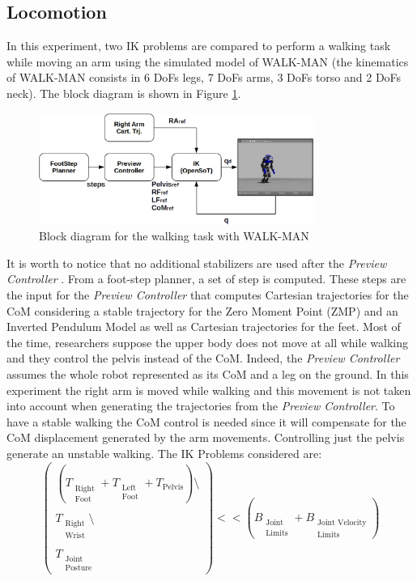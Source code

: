 \subsection{Locomotion}
In this experiment, two IK problems are compared to perform a walking task while moving an arm using the simulated model of WALK-MAN (the kinematics of WALK-MAN consists in 6 DoFs legs, 7 DoFs arms, 3 DoFs torso and 2 DoFs neck). The block diagram is shown in Figure \ref{walk_block_diagram}.
\begin{figure}[!h]
\vspace{2 mm}
\centering
\includegraphics[width=0.8\textwidth]{images/walking/walking.eps}
\caption{Block diagram for the walking task with WALK-MAN}
\label{walk_block_diagram}
\end{figure}
It is worth to notice that no additional stabilizers are used after the \emph{Preview Controller} \cite{Kajita:03}.
From a foot-step planner, a set of step is computed. These steps are the input for the \emph{Preview Controller} that computes Cartesian trajectories for the CoM considering a stable trajectory for the Zero Moment Point (ZMP) and an Inverted Pendulum Model as well as Cartesian trajectories for the feet. Most of the time, researchers suppose the upper body does not move at all while walking and they control the pelvis instead of the CoM. Indeed, the \emph{Preview Controller} assumes the whole robot represented as its CoM and a leg on the ground. In this experiment the right arm is moved while walking and this movement is not taken into account when generating the trajectories from the \emph{Preview Controller}. To have a stable walking the CoM control is needed since it will compensate for the CoM displacement generated by the arm movements. Controlling just the pelvis generate an unstable walking.
The IK Problems considered are:
\begin{equation}
\begin{pmatrix}
\left(T_{\substack{\text{Right}\\\text{Foot}}} + T_{\substack{\text{Left}\\\text{Foot}}} + T_\text{Pelvis}\right)\setminus\\
\\
T_{\substack{\text{Right}\\\text{Wrist}}}\setminus\\
\\
T_{\substack{\text{Joint}\\\text{Posture}}}
\end{pmatrix}
<< \left(B_{\substack{\text{Joint}\\\text{Limits}}} + B_{\substack{\text{Joint Velocity}\\\text{Limits}}}\right)
\end{equation}
